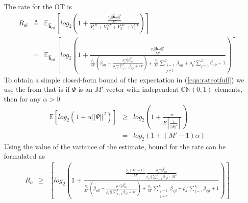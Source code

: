 \documentclass[10pt, a4paper, twoside,fleqn]{article}
\begin{document}
The rate for the OT is
\begin{eqnarray}\label{eqn:rateotfull}
	R_{ol} &\triangleq& \mathbb{E}_{\pmb{\hat h}_{ell}}\left[log_2\left(1+\frac{\frac{\rho_o||\pmb{\hat h}_{ell}||^2}{M'}}{V_1^{OT}+V_2^{OT}+V_3^{OT}+V_4^{OT}}\right) \right] \nonumber \\
            &=&  \mathbb{E}_{\pmb{\hat h}_{ell}}\left[log_2\left(1+\frac{\frac{\rho_o||\pmb{\hat h}_{ell}||^2}{M'}}
								 {\frac{\rho_o}{M'}(\beta_{oll}-\frac{\rho_o\tau_p^o\beta^2_{oll}}{\rho_o\tau_p^o\sum\limits_{j=1}^{L}\beta_{ojl}+M'})        
								  + \frac{\rho_o}{M'} \sum\limits_{\substack{j=1 \\ j\neq l}}^{L} \beta_{ojl} 
								  +\rho_b'\sum\limits_{j=1}^{L}\beta_{ojl}
								  +1}\right) \right]	
\end{eqnarray}
To obtain a simple closed-form bound of the expectation in (\ref{eqn:rateotfull}) we use the from \cite{bib:dtsysBook} that is if $\Psi$ is an $M'$-vector with independent ${\mathbb C}{\mathbb N}(0,1)$ elements, then for any $\alpha>0$
\begin{eqnarray}\label{eqn:bound}
	\mathbb{E}[log_2(1+\alpha||\Psi||^2)] &\geq& log_2\left(1+\frac{\alpha}{E[\frac{1}{||\Psi||^2}]}\right) \nonumber \\
                                              &=&  log_2(1+(M'-1)\alpha)
\end{eqnarray}
Using the value of the variance of the estimate, bound for the rate can be formulated as
\begin{eqnarray}
	R_o &\geq& \left[log_2\left(1+\frac{\frac{\rho_o(M'-1)}{M'}\frac{\rho_o\tau_p^o\beta^2_{oll}}{\rho_o\tau_p^o\sum\limits_{j=1}^{L}\beta_{ojl}+M'}}
								 {\frac{\rho_o}{M'}(\beta_{oll}-\frac{\rho_o\tau_p^o\beta^2_{oll}}{\rho_o\tau_p^o\sum\limits_{j=1}^{L}\beta_{ojl}+M'})        
								  + \frac{\rho_o}{M'} \sum\limits_{\substack{j=1 \\ j\neq l}}^{L} \beta_{ojl} 
								  +\rho_b'\sum\limits_{j=1}^{L}\beta_{ojl}
								  +1}\right) \right]	
\end{eqnarray}
\end{document}
